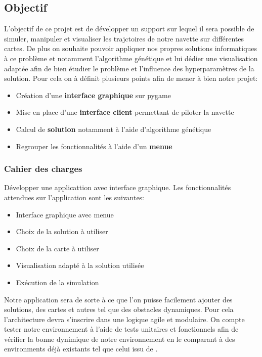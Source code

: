 \documentclass[french,a4paper,10pt,twocolumn]{article}
\begin{document}
\subsection{Objectif}

L'objectif de ce projet est de développer un support sur lequel il sera possible de simuler, manipuler et visualiser les trajctoires de notre navette sur 
différentes cartes.
De plus on souhaite pouvoir appliquer nos propres solutions informatiques à ce problème et notamment l'algorithme génétique et lui dédier une visualisation adaptée
afin de bien étudier le problème et l'influence des hyperparamètres de la solution.
Pour cela on à définit plusieurs points afin de mener à bien notre projet: 
\begin{itemize}
    \item Création d'une \textbf{interface graphique} sur pygame
    \item Mise en place d'une \textbf{interface client} permettant de piloter la navette
    \item Calcul de \textbf{solution} notamment à l'aide d'algorithme génétique    
    \item Regrouper les fonctionnalités à l'aide d'un \textbf{menue}
\end{itemize}

\subsubsection{Cahier des charges}

Développer une applicattion avec interface graphique. Les fonctionnalités attendues sur l'application sont les suivantes:
\begin{itemize}
    \item Interface graphique avec menue
    \item Choix de la solution à utiliser
    \item Choix de la carte à utiliser
    \item Visualisation adapté à la solution utilisée
    \item Exécution de la simulation
\end{itemize}

Notre application sera de sorte à ce que l'on puisse facilement ajouter des solutions, des cartes et autres tel que des obstacles dynamiques.
Pour cela l'architecture devra s'inscrire dans une logique agile et modulaire.
On compte tester notre environnement à l'aide de tests unitaires et fonctionnels afin de vérifier la bonne dynimique de notre environnement en le comparant
à des environments déjà existants tel que celui issu de \cite[CodinGame]{codingame_mars_lander}.
\end{document}
